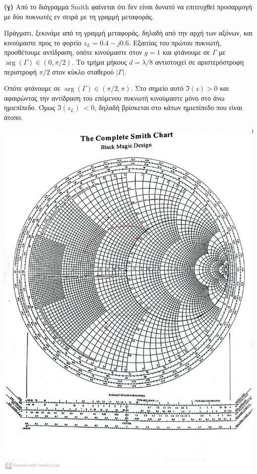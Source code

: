 \documentclass[12pt]{article}
\begin{document}
\textbf{(γ)} Από το διάγραμμα Smith φαίνεται ότι δεν είναι δυνατό να επιτευχθεί προσαρμογή με δύο πυκνωτές εν σειρά με τη γραμμή μεταφοράς. 

Πράγματι, ξεκινάμε από τη γραμμή μεταφοράς, δηλαδή από την αρχή των αξόνων, και κινούμαστε προς το φορτίο \(z_L = 0.4 - j0.6\). 
Εξαιτίας του πρώτου πυκνωτή, προσθέτουμε αντίδραση, οπότε κινούμαστε στον \(g = 1\) και φτάνουμε σε \(\Gamma\) με \(\arg(\Gamma) \in (0, \pi/2)\). Το τμήμα μήκους \(d = \lambda/8\) αντιστοιχεί σε αριστερόστροφη περιστροφή \(\pi/2\) στον κύκλο σταθερού \(|\Gamma|\).

Οπότε φτάνουμε σε \(\arg(\Gamma) \in (\pi/2, \pi)\). Στο σημείο αυτό \(\Im(z) > 0\) και αφαιρώντας την αντίδραση του επόμενου πυκνωτή κινούμαστε μόνο στο άνω ημιεπίπεδο. Όμως \(\Im(z_L)\ < 0\), δηλαδή βρίσκεται στο κάτων ημιεπίπεδο που είναι άτοπο. 

\begin{center}
    \includegraphics*[scale = 0.28]{smith_2_3c.jpg}
\end{center}
\end{document}
